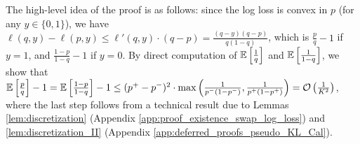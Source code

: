 The high-level idea of the proof is as follows:
since the log loss  is convex in $p$ (for any $y \in \{0, 1\}$), we have $\ell(q, y) - \ell(p, y) \le \ell'(q, y) \cdot (q - p) = \frac{(q - y)(q - p)}{q(1 - q)}$,
which is $\frac{p}{q} - 1$ if $y = 1$, and $\frac{1 - p}{1 - q} - 1$ if $y = 0$. By direct computation of $\mathbb{E}\left[ \frac{1}{q} \right]$ and $\mathbb{E}\left[ \frac{1}{1 - q} \right]$, we show that $\mathbb{E}\left[ \frac{p}{q} \right] - 1 = \mathbb{E}\left[ \frac{1 - p}{1 - q} \right] - 1 \le (p^{+} - p^{-}) ^ {2} \cdot \max\left( \frac{1}{p^{-}(1 - p^{-})}, \frac{1}{p^{+}(1 - p^{+})} \right) = \mathcal{O}\left( \frac{1}{K ^ {2}} \right)$, where the last step follows from a technical result due to Lemmas \ref{lem:discretization} (Appendix \ref{app:proof_existence_swap_log_loss}) and \ref{lem:discretization_II} (Appendix \ref{app:deferred_proofs_pseudo_KL_Cal}).


